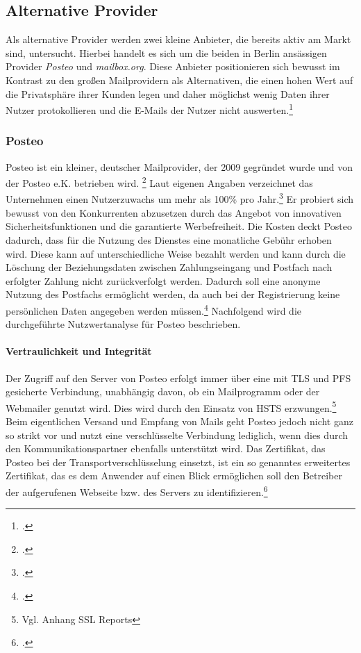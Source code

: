 \documentclass  [paper=a4,
				fontsize=12pt,
				listof=totoc,
				bibliography=totoc
				]{scrreprt}
\begin{document}
			\subsection{Alternative Provider}
			Als alternative Provider werden zwei kleine Anbieter, die bereits aktiv am Markt sind, untersucht.
			Hierbei handelt es sich um die beiden in Berlin ansässigen Provider \textit{Posteo} und \textit{mailbox.org}.
			Diese Anbieter positionieren sich bewusst im Kontrast zu den großen Mailprovidern als Alternativen, die einen hohen Wert auf die Privatsphäre ihrer Kunden legen und daher möglichst wenig Daten ihrer Nutzer protokollieren und die E-Mails der Nutzer nicht auswerten.\footcite[Vgl.][]{Posteo2013a, Mailbox2014}
			
				\subsubsection{Posteo}
				\label{subsubsec:posteo}
					Posteo ist ein kleiner, deutscher Mailprovider, der 2009 gegründet wurde und von der Posteo e.K. betrieben wird. \footcite[Vgl.][]{Posteo2013b}
					Laut eigenen Angaben verzeichnet das Unternehmen einen Nutzerzuwachs um mehr als 100\% pro Jahr.\footcite[Vgl.][]{Posteo2013b}
					Er probiert sich bewusst von den Konkurrenten abzusetzen durch das Angebot von innovativen Sicherheitsfunktionen und die garantierte Werbefreiheit.
					Die Kosten deckt Posteo dadurch, dass für die Nutzung des Dienstes eine monatliche Gebühr erhoben wird.
					Diese kann auf unterschiedliche Weise bezahlt werden und kann durch die Löschung der Beziehungsdaten zwischen Zahlungseingang und Postfach nach erfolgter Zahlung nicht zurückverfolgt werden.
					Dadurch soll eine anonyme Nutzung des Postfachs ermöglicht werden, da auch bei der Registrierung keine persönlichen Daten angegeben werden müssen.\footcite[Vgl.][]{Posteo2013a}
					Nachfolgend wird die durchgeführte Nutzwertanalyse für Posteo beschrieben.
					\medskip\\
					
					\paragraph{Vertraulichkeit und Integrität}
						Der Zugriff auf den Server von Posteo erfolgt immer über eine mit \ac{TLS} und \ac{PFS} gesicherte Verbindung, unabhängig davon, ob ein Mailprogramm oder der Webmailer genutzt wird.
						Dies wird durch den Einsatz von \ac{HSTS} erzwungen.\footnote{Vgl. Anhang SSL Reports}
						Beim eigentlichen Versand und Empfang von Mails geht Posteo jedoch nicht ganz so strikt vor und nutzt eine verschlüsselte Verbindung lediglich, wenn dies durch den Kommunikationspartner ebenfalls unterstützt wird.
						Das Zertifikat, das Posteo bei der Transportverschlüsselung einsetzt, ist ein so genanntes erweitertes Zertifikat, das es dem Anwender auf einen Blick ermöglichen soll den Betreiber der aufgerufenen Webseite bzw. des Servers zu identifizieren.\footcite[Vgl.][]{Posteo2013c}\medskip\\
					
\end{document}
